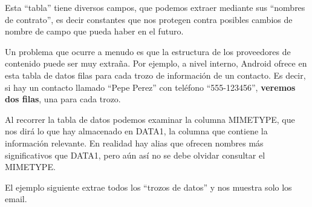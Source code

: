 \documentclass[a4paper,12pt,spanish]{sphinxmanual}
\begin{document}
Esta ``tabla'' tiene diversos campos, que podemos extraer mediante sus ``nombres de contrato'', es decir constantes que nos protegen contra posibles cambios de nombre de campo que pueda haber en el futuro.

Un problema que ocurre a menudo es que la estructura de los proveedores de contenido puede ser muy extraña. Por ejemplo, a nivel interno, Android ofrece en esta tabla de datos filas para cada trozo de información de un contacto. Es decir, si hay un contacto llamado ``Pepe Perez'' con teléfono ``555-123456'', \textbf{veremos dos filas}, una para cada trozo.

Al recorrer la tabla de datos podemos examinar la columna MIMETYPE, que nos dirá lo que hay almacenado en DATA1, la columna que contiene la información relevante. En realidad hay alias que ofrecen nombres más significativos que DATA1, pero aún así no se debe olvidar consultar el MIMETYPE.

El ejemplo siguiente extrae todos los ``trozos de datos'' y nos muestra solo los email.
\end{document}
